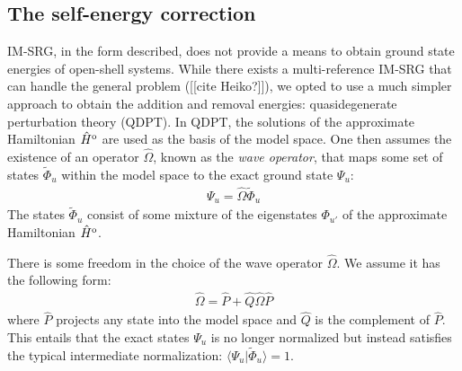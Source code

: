 \documentclass[amsmath, amssymb, aps, floatfix, nofootinbib, preprintnumbers,showpacs, superscriptaddress, twocolumn]{revtex4-1}
\begin{document}
\subsection{The self-energy correction}
\label{subsec:selfenergy}

IM-SRG, in the form described, does not provide a means to obtain ground state
energies of open-shell systems.  While there exists a multi-reference IM-SRG
that can handle the general problem ([[cite Heiko?]]), we opted to use a much
simpler approach to obtain the addition and removal energies: quasidegenerate
perturbation theory (QDPT).  In QDPT, the solutions of the approximate
Hamiltonian $\hat H^{\text o}$ are used as the basis of the model space.  One
then assumes the existence of an operator $\hat \Omega$, known as the
\textit{wave operator}, that maps some set of states $\tilde \Phi_u$ within
the model space to the exact ground state $\Psi_u$:
\begin{align} \label{eq:omega-condition1}
  \Psi_u = \hat \Omega \tilde \Phi_u
\end{align}
The states $\tilde \Phi_u$ consist of some mixture of the eigenstates
$\Phi_{u'}$ of the approximate Hamiltonian $\hat H^{\text o}$.

There is some freedom in the choice of the wave operator $\hat \Omega$.  We
assume it has the following form:
\begin{align} \label{eq:omega-condition2}
  \hat \Omega = \hat P + \hat Q \hat \Omega \hat P
\end{align}
where $\hat P$ projects any state into the model space and $\hat Q$ is the
complement of $\hat P$.  This entails that the exact states $\Psi_u$ is no
longer normalized but instead satisfies the typical intermediate
normalization: $\langle \Psi_u | \tilde \Phi_u \rangle = 1$.
\end{document}

